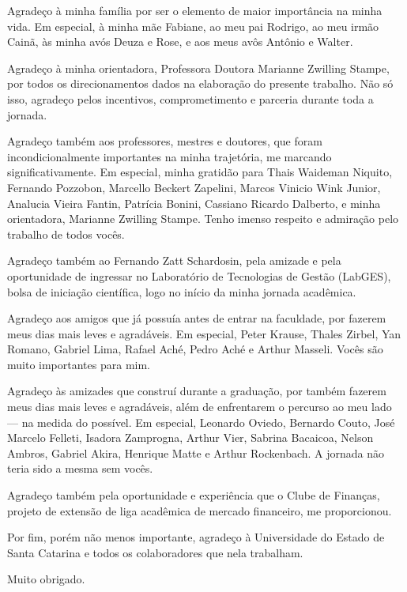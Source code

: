 
\begin{agradecimentos}

Agradeço à minha família por ser o elemento de maior importância na minha vida. Em especial, à minha mãe Fabiane, ao meu pai Rodrigo, ao meu irmão Cainã, às minha avós Deuza e Rose, e aos meus avôs Antônio e Walter.

Agradeço à minha orientadora, Professora Doutora Marianne Zwilling Stampe, por todos os direcionamentos dados na elaboração do presente trabalho. Não só isso, agradeço pelos incentivos, comprometimento e parceria durante toda a jornada.

Agradeço também aos professores, mestres e doutores, que foram incondicionalmente importantes na minha trajetória, me marcando significativamente. Em especial, minha gratidão para Thais Waideman Niquito, Fernando Pozzobon, Marcello Beckert Zapelini, Marcos Vinicio Wink Junior, Analucia Vieira Fantin, Patrícia Bonini, Cassiano Ricardo Dalberto, e minha orientadora, Marianne Zwilling Stampe. Tenho imenso respeito e admiração pelo trabalho de todos vocês.

Agradeço também ao Fernando Zatt Schardosin, pela amizade e pela oportunidade de ingressar no Laboratório de Tecnologias de Gestão (LabGES), bolsa de iniciação científica, logo no início da minha jornada acadêmica.

Agradeço aos amigos que já possuía antes de entrar na faculdade, por fazerem meus dias mais leves e agradáveis. Em especial, Peter Krause, Thales Zirbel, Yan Romano, Gabriel Lima, Rafael Aché, Pedro Aché e Arthur Masseli. Vocês são muito importantes para mim.

Agradeço às amizades que construí durante a graduação, por também fazerem meus dias mais leves e agradáveis, além de enfrentarem o percurso ao meu lado — na medida do possível. Em especial, Leonardo Oviedo, Bernardo Couto, José Marcelo Felleti, Isadora Zamprogna, Arthur Vier, Sabrina Bacaicoa, Nelson Ambros, Gabriel Akira, Henrique Matte e Arthur Rockenbach. A jornada não teria sido a mesma sem vocês.

Agradeço também pela oportunidade e experiência que o Clube de Finanças, projeto de extensão de liga acadêmica de mercado financeiro, me proporcionou.

Por fim, porém não menos importante, agradeço à Universidade do Estado de Santa Catarina e todos os colaboradores que nela trabalham.

Muito obrigado.

\end{agradecimentos}
